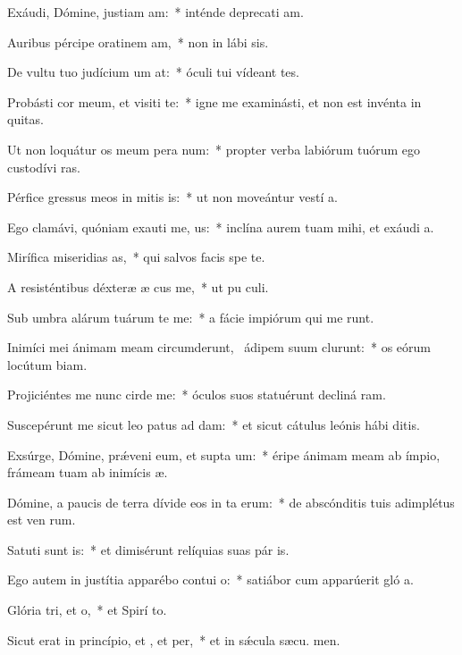 \item Exáudi, Dómine, justiam am:~* inténde deprecati am.
\item Auribus pércipe oratinem am,~* non in lábi sis.
\item De vultu tuo judícium um at:~* óculi tui vídeant tes.
\item Probásti cor meum, et visiti te:~* igne me examinásti, et non est invénta in  quitas.
\item Ut non loquátur os meum pera num:~* propter verba labiórum tuórum ego custodívi  ras.
\item Pérfice gressus meos in mitis is:~* ut non moveántur vestí a.
\item Ego clamávi, quóniam exauti me, us:~* inclína aurem tuam mihi, et exáudi  a.
\item Mirífica miseridias as,~* qui salvos facis spe  te.
\item A resisténtibus déxteræ æ cus me,~* ut pu culi.
\item Sub umbra alárum tuárum te me:~* a fácie impiórum qui me runt.
\item Inimíci mei ánimam meam circumderunt,~\pscross{} ádipem suum clurunt:~* os eórum locútum  biam.
\item Projiciéntes me nunc cirde me:~* óculos suos statuérunt decliná  ram.
\item Suscepérunt me sicut leo patus ad dam:~* et sicut cátulus leónis hábi  ditis.
\item Exsúrge, Dómine, prǽveni eum, et supta um:~* éripe ánimam meam ab ímpio, frámeam tuam ab inimícis  æ.
\item Dómine, a paucis de terra dívide eos in ta erum:~* de abscónditis tuis adimplétus est ven rum.
\item Satuti sunt is:~* et dimisérunt relíquias suas pár is.
\item Ego autem in justítia apparébo contui o:~* satiábor cum apparúerit gló a.
\item Glória tri, et o,~* et Spirí to.
\item Sicut erat in princípio, et , et per,~* et in sǽcula sæcu. men.
